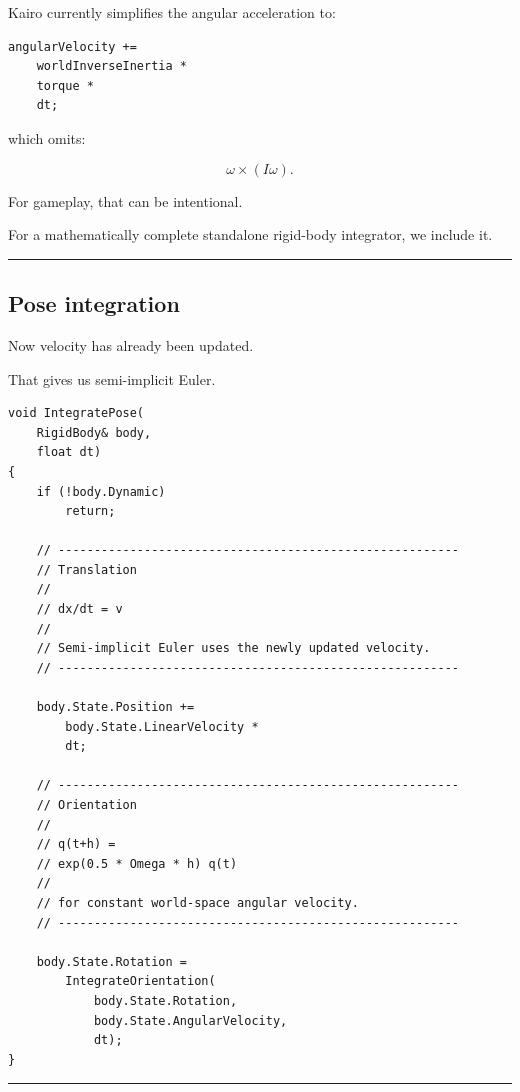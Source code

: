 Kairo currently simplifies the angular acceleration to:

\begin{verbatim}
angularVelocity +=
    worldInverseInertia *
    torque *
    dt;
\end{verbatim}

which omits:

\[
\omega\times(I\omega).
\]

For gameplay, that can be intentional.

For a mathematically complete standalone rigid-body integrator, we include it.

\begin{center}\rule{0.5\linewidth}{0.5pt}\end{center}

\subsection{Pose integration}\label{06-engine-ii-ch039-pose-integration}

\hypertarget{06-engine-ii-ch039-pose-integration}{}

Now velocity has already been updated.

That gives us semi-implicit Euler.

\begin{verbatim}
void IntegratePose(
    RigidBody& body,
    float dt)
{
    if (!body.Dynamic)
        return;

    // --------------------------------------------------------
    // Translation
    //
    // dx/dt = v
    //
    // Semi-implicit Euler uses the newly updated velocity.
    // --------------------------------------------------------

    body.State.Position +=
        body.State.LinearVelocity *
        dt;

    // --------------------------------------------------------
    // Orientation
    //
    // q(t+h) =
    // exp(0.5 * Omega * h) q(t)
    //
    // for constant world-space angular velocity.
    // --------------------------------------------------------

    body.State.Rotation =
        IntegrateOrientation(
            body.State.Rotation,
            body.State.AngularVelocity,
            dt);
}
\end{verbatim}

\begin{center}\rule{0.5\linewidth}{0.5pt}\end{center}

